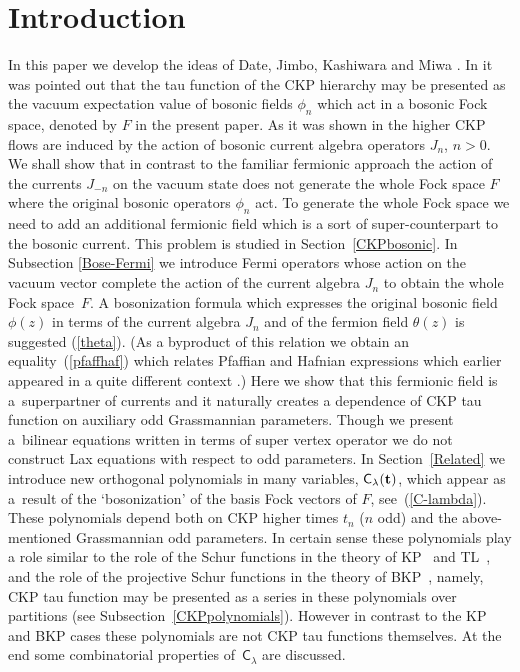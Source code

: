 \documentclass[pdftex]{sigma}
\numberwithin{equation}{section}
\newcommand{\C}{\textsf{C}_}
\newcommand{\bt}{{\bf {t}}}
\begin{document}
\vspace{-2mm}

\renewcommand{\thefootnote}{\arabic{footnote}}
\setcounter{footnote}{0}

\section{Introduction}

In this paper we develop the ideas of  Date, Jimbo, Kashiwara
and Miwa \cite{DJKM-CKP,DJKMVI}. In
\cite{DJKMVI} it was pointed out that the tau function of the
CKP hierarchy may be presented as the vacuum expectation value of
bosonic f\/ields $\phi_n$ which act in a bosonic Fock space, denoted
by $F$ in the present paper. As it was shown in \cite{DJKMVI}
the higher CKP f\/lows are induced by the action of bosonic current
algebra operators $J_n$, $n>0$. We shall show that in contrast to
the familiar fermionic approach the action of the currents
$J_{-n}$ on the vacuum state does not generate the whole
Fock space $F$ where the original bosonic operators $\phi_n$ act.
To generate the whole Fock space we need to add an additional
fermionic f\/ield which is a sort of super-counterpart to the
bosonic current. This problem is studied  in Section~\ref{CKPbosonic}. In Subsection \ref{Bose-Fermi} we introduce
Fermi operators  whose action on the vacuum vector
complete the action of the current algebra $J_n$ to obtain the
whole Fock space~$F$. A bosonization formula which expresses the
original bosonic f\/ield $\phi(z)$ in terms of the current algebra  $J_n$
and of the fermion f\/ield $\theta(z)$ is suggested (\ref{theta}).
(As a byproduct of this relation we obtain an equality~(\ref{pfaffhaf}) which relates Pfaf\/f\/ian and Hafnian expressions
which earlier appeared in a quite dif\/ferent context \cite{IKO}.)
Here we show that this fermionic f\/ield is a~superpartner of
currents and it naturally creates a dependence of CKP tau function
on auxiliary odd Grassmannian parameters. Though we present a~bilinear equations written in terms of super vertex operator we do
not construct Lax equations with respect to odd parameters. In
Section~\ref{Related} we introduce new orthogonal polynomials in
many variables, $\C\lambda(\bt)$, which appear as a~result of the
`bosonization' of the basis Fock vectors of $F$, see~(\ref{C-lambda}). These polynomials depend both on CKP higher
times $t_n$ ($n$ odd) and the above-mentioned Grassmannian odd
parameters. In certain sense these polynomials play a role similar
to the role of the Schur functions in the theory of KP~\cite{Sa}
and TL~\cite{Tinit}, and the role of the projective Schur
functions in the theory of BKP~\cite{Nimmo, You}, namely,
CKP tau function may be presented as a series in these polynomials
over partitions (see Subsection~\ref{CKPpolynomials}). However in
contrast to the KP and BKP cases these polyno\-mials are not CKP tau
functions themselves. At the end some combinatorial properties of~$\C\lambda$ are discussed.
\end{document}
